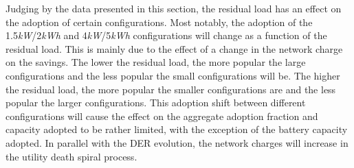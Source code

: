 Judging by the data presented in this section, the residual load has an effect on the adoption of certain configurations. Most notably, the adoption of the 1.5\textit{kW}/2\textit{kWh} and 4\textit{kW}/5\textit{kWh} configurations will change as a function of the residual load. This is mainly due to the effect of a change in the network charge on the savings. The lower the residual load, the more popular the large configurations and the less popular the small configurations will be. The higher the residual load, the more popular the smaller configurations are and the less popular the larger configurations. This adoption shift between different configurations will cause the effect on the aggregate adoption fraction and capacity adopted to be rather limited, with the exception of the battery capacity adopted. In parallel with the DER evolution, the network charges will increase in the utility death spiral process. 
